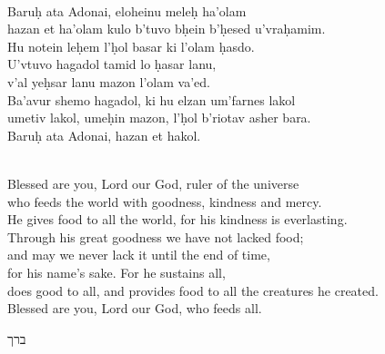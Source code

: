 \documentclass[a4paper,10pt,openany]{memoir}
\newcommand{\hchapter}[1]{
  \begin{hebrew}
    \begin{Spacing}{.97}
      \newpage
      \strut

      \vspace{.15em}

      \noindent\Huge #1

      \vspace{1em}
    \end{Spacing}
  \end{hebrew}
}
\newenvironment{HgEnglish}{\strut\\\noindent}{\vspace{1em}}
\newenvironment{HgTranslit}{\strut\\\noindent\begin{itshape}}{\end{itshape}\vspace{1em}}
\begin{document}
\begin{HgTranslit}
  Baru\d{h} ata Adonai, eloheinu mele\d{h} ha'olam \\
  hazan et ha'olam kulo b'tuvo b\d{h}ein b'\d{h}esed u'vra\d{h}amim. \\
  Hu notein le\d{h}em l'\d{h}ol basar ki l'olam \d{h}asdo. \\
  U'vtuvo hagadol tamid lo \d{h}asar lanu, \\
  v'al ye\d{h}sar lanu mazon l'olam va'ed. \\
  Ba'avur shemo hagadol, ki hu elzan um'farnes lakol \\
  umetiv lakol, ume\d{h}in mazon, l'\d{h}ol b'riotav asher bara. \\
  Baru\d{h} ata Adonai, hazan et hakol.
\end{HgTranslit}
\begin{HgEnglish}
  Blessed are you, Lord our God, ruler of the universe \\
  who feeds the world with goodness, kindness and mercy. \\
  He gives food to all the world, for his kindness is everlasting. \\
  Through his great goodness we have not lacked food; \\
  and may we never lack it until the end of time, \\
  for his name's sake. For he sustains all, \\
  does good to all, and provides food to all the creatures he created. \\
  Blessed are you, Lord our God, who feeds all.
\end{HgEnglish}

\vfill

\hchapter{ברך}
\end{document}
